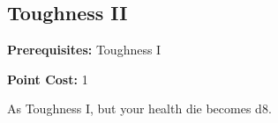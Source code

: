 \subsection{Toughness II}\label{feat:toughness2}

\noindent
\textbf{Prerequisites:} Toughness I

\noindent
\textbf{Point Cost:} 1 

As Toughness I, but your health die becomes d8.
